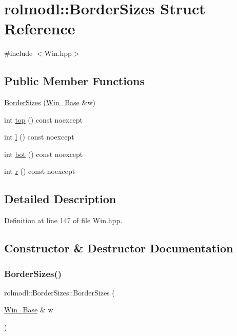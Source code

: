 \hypertarget{structrolmodl_1_1_border_sizes}{}\section{rolmodl\+::Border\+Sizes Struct Reference}
\label{structrolmodl_1_1_border_sizes}


{\ttfamily \#include $<$Win.\+hpp$>$}

\subsection*{Public Member Functions}
\begin{DoxyCompactItemize}
\item 
\mbox{\hyperlink{structrolmodl_1_1_border_sizes_ac3a2fdfd6442733c3cedc796ac70653c}{Border\+Sizes}} (\mbox{\hyperlink{classrolmodl_1_1_win___base}{Win\+\_\+\+Base}} \&w)
\item 
int \mbox{\hyperlink{structrolmodl_1_1_border_sizes_ad2daee506a395cd8e423242ba9c418f1}{top}} () const noexcept
\item 
int \mbox{\hyperlink{structrolmodl_1_1_border_sizes_a4906a70ed9d5c1e8a231682a16bea323}{l}} () const noexcept
\item 
int \mbox{\hyperlink{structrolmodl_1_1_border_sizes_acd2836373349038673f32df645778ef5}{bot}} () const noexcept
\item 
int \mbox{\hyperlink{structrolmodl_1_1_border_sizes_a3ae3799a0ae840b26b76b966b71c0552}{r}} () const noexcept
\end{DoxyCompactItemize}


\subsection{Detailed Description}


Definition at line 147 of file Win.\+hpp.



\subsection{Constructor \& Destructor Documentation}
\mbox{\label{structrolmodl_1_1_border_sizes_ac3a2fdfd6442733c3cedc796ac70653c}} 
\subsubsection{\texorpdfstring{BorderSizes()}{BorderSizes()}}
{\footnotesize\ttfamily rolmodl\+::\+Border\+Sizes\+::\+Border\+Sizes (\begin{DoxyParamCaption}\item[{\mbox{\hyperlink{classrolmodl_1_1_win___base}{Win\+\_\+\+Base}} \&}]{w }\end{DoxyParamCaption})\hspace{0.3cm}{\ttfamily [explicit]}}




